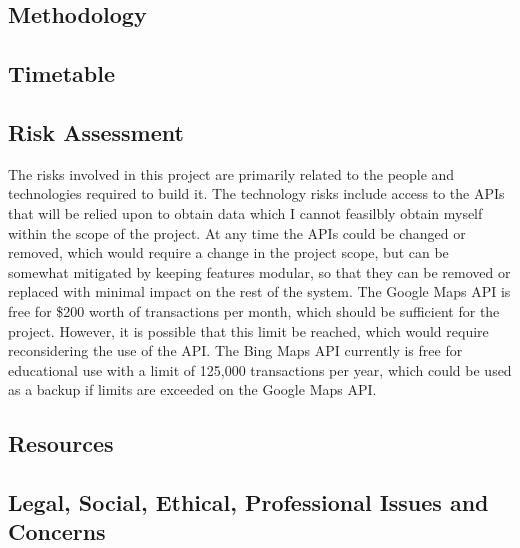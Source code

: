 \subsection{Methodology}
\subsection{Timetable}
\subsection{Risk Assessment}
The risks involved in this project are primarily related to the people and technologies required to build it.
The technology risks include access to the APIs that will be relied upon to obtain data which I cannot feasilbly obtain myself within the scope of the project.
At any time the APIs could be changed or removed, which would require a change in the project scope, but can be somewhat mitigated by keeping features modular, so that they can be removed or replaced with minimal impact on the rest of the system.
The Google Maps API is free for \$200 worth of transactions per month, which should be sufficient for the project. However, it is possible that this limit be reached, which would require reconsidering the use of the API.
The Bing Maps API currently is free for educational use with a limit of 125,000 transactions per year, which could be used as a backup if limits are exceeded on the Google Maps API.
\subsection{Resources}
\subsection{Legal, Social, Ethical, Professional Issues and Concerns}